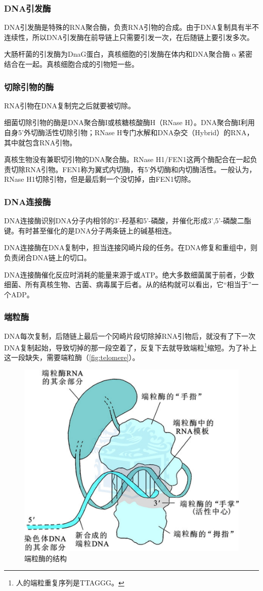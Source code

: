 \subsubsection{DNA引发酶}

DNA引发酶是特殊的RNA聚合酶，负责RNA引物的合成。由于DNA复制具有半不连续性，所以DNA引发酶在前导链上只需要引发一次，在后随链上要引发多次。

大肠杆菌的引发酶为DnaG蛋白，真核细胞的引发酶在体内和DNA聚合酶$\upalpha$紧密结合在一起。真核细胞合成的引物短一些。

\subsubsection{切除引物的酶}

RNA引物在DNA复制完之后就要被切除。

细菌切除引物的酶是DNA聚合酶I或核糖核酸酶H（RNase H）。DNA聚合酶I利用自身5'外切酶活性切除引物；RNase H专门水解和DNA杂交（Hybrid）的RNA，其中就包含RNA引物。

真核生物没有兼职切引物的DNA聚合酶。RNase H1/FEN1这两个酶配合在一起负责切除RNA引物。FEN1称为翼式内切酶，有5'外切酶和内切酶活性。一般认为，RNase H1切除引物，但是最后剩一个没切掉，由FEN1切除。

\subsubsection{DNA连接酶}

DNA连接酶识别DNA分子内相邻的3'-羟基和5'-磷酸，并催化形成3',5'-磷酸二酯键。有时甚至催化的是DNA分子两条链上的碱基相连。

DNA连接酶在DNA复制中，担当连接冈崎片段的任务。在DNA修复和重组中，则负责闭合DNA链上的切口。

DNA连接酶催化反应时消耗的能量来源于或ATP。绝大多数细菌属于前者，少数细菌、所有真核生物、古菌、病毒属于后者。从的结构就可以看出，它“相当于”一个ADP。

\subsubsection{端粒酶}

DNA每次复制，后随链上最后一个冈崎片段切除掉RNA引物后，就没有了下一次DNA复制起始，导致切掉的那一段空着了，反复下去就导致端粒\footnote{人的端粒重复序列是TTAGGG。}缩短。为了补上这一段缺失，需要端粒酶（\autoref{fig:telomere}）。

\begin{figure}[h]
	\centering
	\includegraphics[width=0.5\linewidth]{Pics/端粒酶}
	\caption{端粒酶的结构}
	\label{fig:telomere}
\end{figure}


